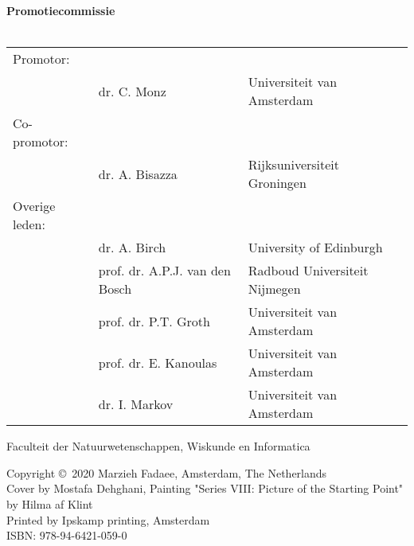 {%
\clearpage
\noindent%
\textbf{Promotiecommissie} \\\\
\begin{tabular}{@{}l l l}
Promotor: \\
& dr. C. Monz & Universiteit van Amsterdam \\  %
Co-promotor: \\
& dr. A. Bisazza & Rijksuniversiteit Groningen \\
Overige leden: \\
& dr. A. Birch & University of Edinburgh \\
 & prof. dr. A.P.J. van den Bosch & Radboud Universiteit Nijmegen \\
 & prof. dr. P.T. Groth & Universiteit van Amsterdam \\
  & prof. dr. E. Kanoulas & Universiteit van Amsterdam \\
 & dr. I. Markov & Universiteit van Amsterdam \\
\end{tabular}

\bigskip\noindent%
Faculteit der Natuurwetenschappen, Wiskunde en Informatica\\

\vfill

\noindent
\bigskip

\noindent
Copyright \copyright~2020 Marzieh Fadaee, Amsterdam, The Netherlands\\
Cover by Mostafa Dehghani, Painting "Series VIII: Picture of the Starting Point" by Hilma af Klint \\
Printed by Ipskamp printing, Amsterdam\\
ISBN: 978-94-6421-059-0\\
\clearpage
}

